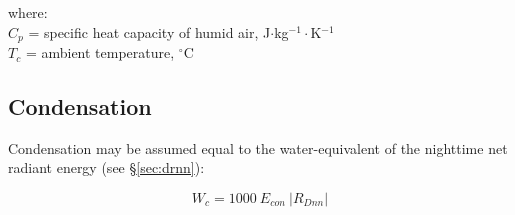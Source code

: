 \noindent where: \\ 
\indent $C_p$ = specific heat capacity of humid air, J$\cdot$kg$^{-1}\cdot$K$^{-1}$\\
\indent $T_c$ = ambient temperature, $^{\circ}$C\\

\subsection{Condensation}
\label{sec:cond}
Condensation may be assumed equal to the water-equivalent of the nighttime net radiant energy (see \S \ref{sec:drnn}):

\begin{equation}
\label{eq:cond}
	W_c = 1000\: E_{con}\: \lvert R_{Dnn} \rvert
\end{equation}

